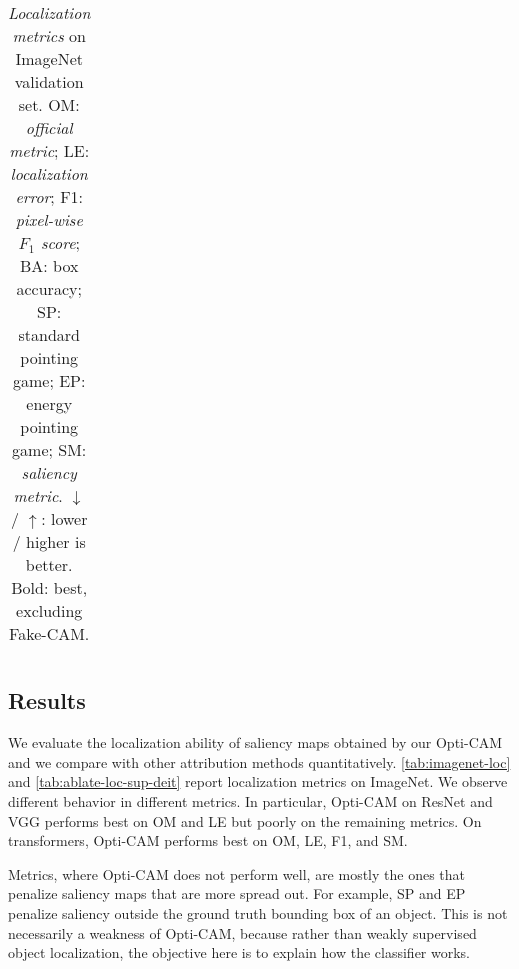 \begin{table}[ht]
\begin{tabular}{lccc|cccc|ccc|cccc}
\bottomrule
\end{tabular}
\caption{\emph{Localization metrics} on ImageNet validation set. OM: \emph{official metric}; LE: \emph{localization error}; F1: \emph{pixel-wise $F_1$ score}; BA: box accuracy; SP: standard pointing game; EP: energy pointing game; SM: \emph{saliency metric}. $\downarrow$ / $\uparrow$: lower / higher is better. Bold: best, excluding Fake-CAM.}
\label{tab:imagenet-loc}
\end{table}


\subsection{Results}

We evaluate the localization ability of saliency maps obtained by our Opti-CAM and we compare with other attribution methods quantitatively. \autoref{tab:imagenet-loc} and \autoref{tab:ablate-loc-sup-deit} report localization metrics on ImageNet. We observe different behavior in different metrics. In particular, Opti-CAM on ResNet and VGG performs best on OM and LE but poorly on the remaining metrics. On transformers, Opti-CAM performs best on OM, LE, F1, and SM.

Metrics, where Opti-CAM does not perform well, are mostly the ones that penalize saliency maps that are more spread out. For example, SP and EP penalize saliency outside the ground truth bounding box of an object. This is not necessarily a weakness of Opti-CAM, because rather than weakly supervised object localization, the objective here is to explain how the classifier works.

